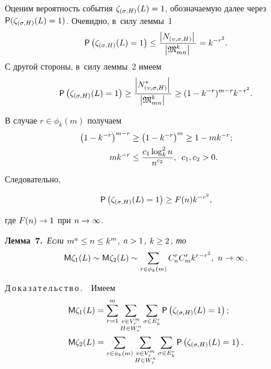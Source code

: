 \begin{multicols}{2}
  Оценим вероятность события $\zeta_{(\sigma,H)}(L)\hm=1$, обозначаемую 
далее через ${\sf P}(\zeta_{(\sigma,H)}(L)\hm=1)$. Очевидно, в~силу леммы~1
  \begin{equation}
  {\sf P}\left( \zeta_{(\sigma,H)}(L)=1\right) \leq \displaystyle\frac{\displaystyle \left\vert 
N_{(v,\sigma,H)}\right\vert \mathstrut}{\displaystyle \left \vert \mathfrak{M}^k_{mn}\right\vert \mathstrut} =k^{-
r^2}.
  \label{e1-duk}
\end{equation}
  С другой стороны, в~силу леммы~2 имеем
  $$
  {\sf P}\left( \zeta_{(\sigma,H)}(L)=1\right) \geq \displaystyle\frac{\displaystyle \left\vert 
N^*_{(v,\sigma,H)}\right\vert \mathstrut}{\displaystyle \left\vert \mathfrak{M}^k_{mn}\right\vert \mathstrut} \geq (1-k^{-
r})^{m-r} k^{-r^2}.
  $$
  
  В случае $r\in \phi_k(m)$ получаем 
\begin{align*}
  \left(1- k^{-r}\right)^{m-r}&\geq \left(1- k^{-r}\right)^m \geq 1- mk^{-r};
\\
mk^{-r} &\leq  \displaystyle\frac{\displaystyle c_1 \log_k^2 n\mathstrut}{\displaystyle n^{c_2}\mathstrut},\enskip c_1,  c_2>0.
\end{align*}
 Следовательно,
 
 \noindent
  \begin{equation}
  {\sf P}\left( \zeta_{(\sigma,H)}(L)=1\right)\geq F(n) k^{-r^2},
  \label{e2-duk}
 \end{equation}
 
 \vspace*{-2pt}
 
 \noindent
где $F(n)\hm\to 1$ при $n\hm\to \infty$.
  
  
  \smallskip
  
  \noindent
  \textbf{Лемма~7.}\  \textit{Если $m^a\hm\leq n\hm\leq k^m$, $a\hm>1$, 
$k\hm\geq 2$, то}
  $$
  {\sf M}\zeta_1(L)\sim {\sf M}\zeta_2(L)\sim\sum\limits_{r\in \phi_k(m)} C_n^r C_m^r k^{r-
r^2},\ n\to \infty\,.
  $$
  
  \noindent
  Д\,о\,к\,а\,з\,а\,т\,е\,л\,ь\,с\,т\,в\,о\,.\ \ Имеем
  \begin{align*}
  {\sf M}\zeta_1(L) &= \sum\limits^m_{r=1} \sum\limits_{\substack{{v\in V_r^m}\\ {H\in W_r^n}}} 
\sum\limits_{\sigma\in E_k^r} {\sf P}\left( \zeta_{(\sigma,H)}(L)=1\right);\\
  {\sf M}\zeta_2(L)&= \sum\limits_{r\in \phi_k(m)}
  \sum\limits_{\substack{{v\in V_r^m}\\ {H\in  W_r^n}}} \sum\limits_{\sigma\in E_k^r} {\sf P}\left( \zeta_{(\sigma,H)}(L)=1\right).
  \end{align*}
%  

 \vspace*{-2pt}
 

\end{multicols}
